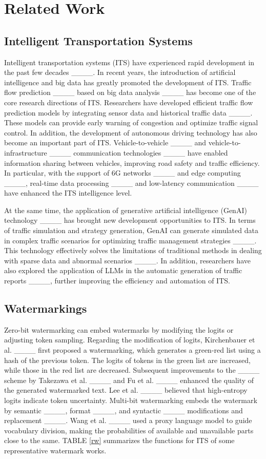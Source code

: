 \section{Related Work}
\label{sec2}
	\subsection{Intelligent Transportation Systems} 
	Intelligent transportation systems (ITS) have experienced rapid development in the past few decades ____. In recent years, the introduction of artificial intelligence and big data has greatly promoted the development of ITS. Traffic flow prediction ____ based on big data analysis ____ has become one of the core research directions of ITS. Researchers have developed efficient traffic flow prediction models by integrating sensor data and historical traffic data ____. These models can provide early warning of congestion and optimize traffic signal control. In addition, the development of autonomous driving technology has also become an important part of ITS. Vehicle-to-vehicle ____ and vehicle-to-infrastructure ____ communication technologies ____ have enabled information sharing between vehicles, improving road safety and traffic efficiency. In particular, with the support of 6G networks ____ and edge computing ____, real-time data processing ____ and low-latency communication ____ have enhanced the ITS intelligence level.
	
	At the same time, the application of generative artificial intelligence (GenAI) technology ____ has brought new development opportunities to ITS. In terms of traffic simulation and strategy generation, GenAI can generate simulated data in complex traffic scenarios for optimizing traffic management strategies ____. This technology effectively solves the limitations of traditional methods in dealing with sparse data and abnormal scenarios ____. In addition, researchers have also explored the application of LLMs in the automatic generation of traffic reports ____, further improving the efficiency and automation of ITS.
	
	
	\subsection{Watermarkings} 
	Zero-bit watermarking can embed watermarks by modifying the logits or adjusting token sampling. Regarding the modification of logits, Kirchenbauer et al. ____ first proposed a watermarking, which generates a green-red list using a hash of the previous token. The logits of tokens in the green list are increased, while those in the red list are decreased. Subsequent improvements to the ____ scheme by Takezawa et al. ____ and Fu et al. ____ enhanced the quality of the generated watermarked text. Lee et al. ____ believed that high-entropy logits indicate token uncertainty. Multi-bit watermarking embeds the watermark by semantic ____, format ____, and syntactic ____ modifications and replacement ____. Wang et al. ____ used a proxy language model to guide vocabulary division, making the probabilities of available and unavailable parts close to the same. TABLE \ref{rw} summarizes the functions for ITS of some representative watermark works.
	
